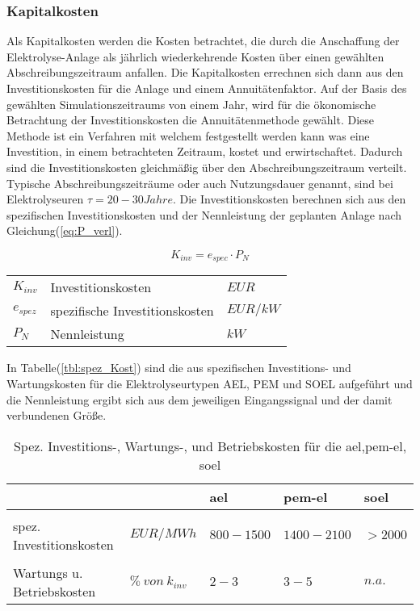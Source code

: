 \documentclass[onecolumn,10pt,titlepage]{article}
\begin{document}
			\subsubsection*{Kapitalkosten}
			Als Kapitalkosten werden die Kosten betrachtet, die durch die Anschaffung der Elektrolyse-Anlage als jährlich wiederkehrende Kosten über einen gewählten Abschreibungszeitraum anfallen. Die Kapitalkosten errechnen sich dann aus den Investitionskosten für die Anlage und einem Annuitätenfaktor. Auf der Basis des gewählten Simulationszeitraums von einem Jahr, wird für die ökonomische Betrachtung der Investitionskosten die Annuitätenmethode gewählt. Diese Methode ist ein Verfahren mit welchem festgestellt werden kann was eine Investition, in einem betrachteten Zeitraum, kostet und erwirtschaftet. Dadurch sind die Investitionskosten gleichmäßig über den Abschreibungszeitraum verteilt. Typische Abschreibungszeiträume oder auch Nutzungsdauer genannt, sind bei Elektrolyseuren $\tau = 20-30 Jahre$.\cite{Missal.12.03.2014} Die Investitionskosten berechnen sich aus den spezifischen Investitionskosten und der Nennleistung der geplanten Anlage nach Gleichung(\ref{eq:P_verl}). 
			
			\begin{equation}
			\label{eq:P_verl}
				K_{inv} = e_{spec} \cdot P_N
			\end{equation}
			
			\begin{table}[H]
				\begin{tabular*}{\textwidth}{lll}
					$K_{inv}$&Investitionskosten&$EUR$\\
					$e_{spez}$&spezifische Investitionskosten&$EUR/kW$\\
					$P_N$&Nennleistung&$kW$\\
				\end{tabular*}
			\end{table}
			
			In Tabelle(\ref{tbl:spez_Kost}) sind die aus \cite{Buttler.2018} spezifischen Investitions- und Wartungskosten für die Elektrolyseurtypen AEL, PEM und SOEL aufgeführt und die Nennleistung ergibt sich aus dem jeweiligen Eingangssignal und der damit verbundenen Größe.
				
			\begin{table}[H]
				
				\caption{Spez. Investitions-, Wartungs-, und Betriebskosten für die \gls{ael},\gls{pem}-\gls{el}, \gls{soel}}
					\begin{tabular*}{\textwidth}{lll|l|l}
						
						&& {\textbf{\gls{ael}}}& {\textbf{\gls{pem}-\gls{el}}} & {\textbf{\gls{soel}}} \\ 
						\hline\hline
						&&&&\\
						spez. Investitionskosten& $EUR/MWh$ &$800-1500$&$1400-2100$&$>2000$\\
						&&&&\\
						Wartungs u. Betriebskosten& $\%~von~k_{inv}$ &$2-3$&$3-5$&$n.a.$\\
					\end{tabular*}
					\label{tab:spez_Kost}
				\end{table}
					
\end{document}
